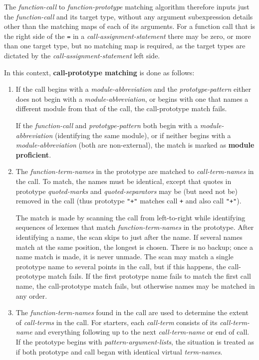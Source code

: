 \documentclass[12pt]{article}
\newcommand{\key}[1]{{\rm \bfseries #1}}
\begin{document}
The {\em function-call} to {\em function-prototype}
matching algorithm therefore
inputs just the {\em function-call} and its target type,
without any argument subexpression details
other than the matching maps of each of its arguments.
For a function call
that is the right side of the {\tt =}
in a {\em call-assignment-statement} there may
be zero, or more than one target type, but no matching map is
required, as the target types are dictated by the
{\em call-assignment-statement} left side.

In this context, \key{call-prototype matching} is done as follows:

\begin{enumerate}
\item\label{CALL-PROTOTYPE-MODULE-ABBREVIATION}
If the call begins with a {\em module-abbreviation}
and the {\em prototype-pattern}
either does not begin with a {\em module-abbreviation},
or begins with one that names a different module from that of the call,
the call-prototype match fails.

If the {\em function-call} and {\em prototype-pattern} both begin
with a {\em module-abbreviation} (identifying the same module), or
if neither begins with a {\em module-abbreviation} (both are non-external),
the match is marked as \key{module proficient}\label{MODULE-PROFICIENT}.

\item\label{CALL-PROTOTYPE-TERM-NAMES}
The {\em function-term-names} in the prototype are matched to
{\em call-term-names} in the call.  To match, the names must be identical,
except that quotes in prototype
{\em quoted-marks} and {\em quoted-separators} may be (but need not be)
removed in the call
(thus prototype {\tt "+"} matches call {\tt +} and also call {\tt "+"}).

The match is made by scanning the call from left-to-right
while identifying sequences of lexemes that match
{\em function-term-names} in the prototype.  After identifying
a name, the scan skips to just after the name.  If several
names match at the same position, the longest is chosen.  There is
no backup; once a name match is made, it is never unmade.
The scan may match a single prototype name to several points in the
call, but if this happens, the call-prototype match fails.
If the first prototype name fails to match the first call name,
the call-prototype match fails, but otherwise names may be matched
in any order.

\item\label{CALL-PROTOTYPE-CALL-TERMS}
The {\em function-term-names} found in the call are used to determine
the extent of {\em call-terms} in the call.  For starters, each
{\em call-term} consists of its {\em call-term-name} and everything
following up to the next {\em call-term-name} or end of call.
If the prototype begins
with {\em pattern-argument-lists}, the situation is treated as
if both prototype and call began with identical virtual
{\em term-names}.


\end{enumerate}
\end{document}
